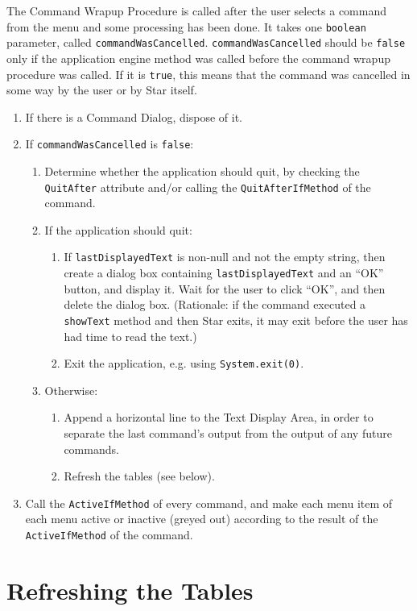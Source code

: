 \documentclass[11pt]{article}
\begin{document}
The Command Wrapup Procedure is called after the user selects a
command from the menu and some processing has been done.  It takes
one {\tt boolean} parameter,
called {\tt commandWasCancelled}.  {\tt commandWasCancelled}
should be {\tt false} only if the application engine method was called before
the command wrapup procedure was called.  If it is {\tt true}, this means that
the command was cancelled in some way by the user or by Star itself.
\begin{enumerate}
\item If there is a Command Dialog, dispose of it.
\item If {\tt commandWasCancelled} is {\tt false}:
  \begin{enumerate}
  \item Determine whether the application should quit, by checking
    the {\tt QuitAfter} attribute and/or calling the {\tt QuitAfterIfMethod}
    of the command.
  \item If the application should quit:
    \begin{enumerate}
    \item If {\tt lastDisplayedText} is non-null and not the empty string,
      then create a dialog box containing {\tt lastDisplayedText} and
      an ``OK'' button, and display it.  Wait for the user to
      click ``OK'', and then delete the dialog box.
      (Rationale:  if the command executed a {\tt showText} method and
      then Star exits, it may exit before the user has had time to
      read the text.)
    \item Exit the application, e.g. using {\tt System.exit(0)}.
    \end{enumerate}
  \item Otherwise:
    \begin{enumerate}
    \item Append a horizontal line to the Text Display Area, in order to
      separate the last command's output from the output of any
      future commands.
    \item Refresh the tables (see below).
    \end{enumerate}
  \end{enumerate}
\item Call the {\tt ActiveIfMethod} of every command, and make each
  menu item of each menu active or inactive (greyed out) according to
  the result of the {\tt ActiveIfMethod} of the command.
\end{enumerate}

\section{Refreshing the Tables}
\end{document}
